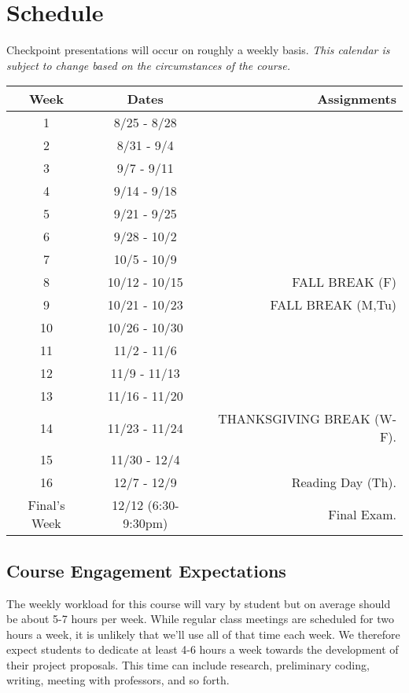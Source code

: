 \documentclass[10pt]{article}
\begin{document}
\section{Schedule}

Checkpoint presentations will occur on roughly a weekly basis. \textit{This calendar is subject to change based on the circumstances of the course.}

\begin{center}
\begin{tabular}{|c|c|r|}
\hline 
Week & Dates & Assignments \\
\hline
1 & 8/25 - 8/28 &  \\
\hline 
2 & 8/31 - 9/4 &   \\
\hline
3 & 9/7 - 9/11 &   \\
\hline
4 & 9/14 - 9/18 &   \\
\hline
5 & 9/21 - 9/25 &  \\
\hline
6 & 9/28 - 10/2 & \\
\hline
7 & 10/5 - 10/9  &  \\
\hline 
8 & 10/12 - 10/15 &  FALL BREAK (F) \\
\hline
9 & 10/21 - 10/23 & FALL BREAK (M,Tu) \\
\hline
10 & 10/26 - 10/30 &  \\
\hline
11 & 11/2 - 11/6 & \\
\hline
12 & 11/9 - 11/13 &  \\
\hline
13 & 11/16 - 11/20 & \\
\hline
14 & 11/23 - 11/24 &  THANKSGIVING BREAK (W-F).   \\
\hline
15 & 11/30 - 12/4 & \\ 
\hline
16 & 12/7 - 12/9 &   Reading Day (Th). \\
\hline
Final's Week & 12/12 (6:30-9:30pm) & Final Exam. \\ 
\hline
\end{tabular}
\end{center}

\subsection{Course Engagement Expectations}

The weekly workload for this course will vary by student but on average should be about 5-7 hours per week.  While regular class meetings are scheduled for two hours a week, it is unlikely that we'll use all of that time each week.  We therefore expect students to dedicate at least 4-6 hours a week towards the development of their project proposals.  This time can include research, preliminary coding, writing, meeting with professors, and so forth.
\end{document}
